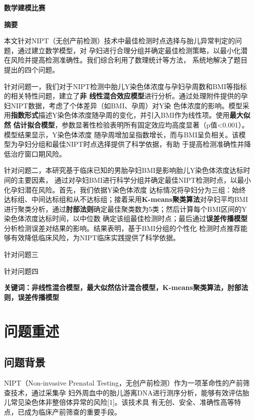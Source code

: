 \documentclass{article}
\date{}
\begin{document}
\vspace{-30pt}
\begin{center}
    \Large \textbf{数学建模比赛}  %
\end{center}
\vspace{-13pt}
\begin{center}
    \large \textbf{摘要}  %
\end{center}
\qquad 本文针对NIPT（无创产前检测）技术中最佳检测时点选择与胎儿异常判定的问题，通过建立数学模型，对
孕妇进行合理分组并确定最佳检测策略，以最小化潜在风险并提高检测准确性。我们综合利用了数理统计等方法，
系统地解决了题目提出的四个问题。

针对问题一，我们对于NIPT检测中胎儿Y染色体浓度与孕妇孕周数和BMI等指标的相关特性问题，建立了\textbf{非
    线性混合效应模型}进行分析。通过处理附件提供的孕妇NIPT数据，考虑了个体差异（如BMI、孕周）对Y染
色体浓度的影响。模型采用\textbf{指数形式}描述Y染色体浓度随孕周的变化，并引入BMI作为线性项。使用\textbf{最大似然
    估计拟合模型}，参数显著性检验表明所有固定效应均高度显著（p值<0.001）。模型结果显示，Y染色体浓度
随孕周增加呈指数增长，而与BMI呈负相关。该模型为孕妇分组和最佳NIPT时点选择提供了科学依据，有助
于提高检测准确性并降低治疗窗口期风险。

针对问题二，本研究基于临床已知的男胎孕妇BMI是影响胎儿Y染色体浓度达标时间的主要因素，
通过对孕妇BMI进行科学分组并确定最佳NIPT检测时点，以最小化孕妇潜在风险。首先，我们依据Y染色体浓度
达标情况将孕妇分为三组：始终达标组、中间达标组和从不达标组；接着采用\textbf{K-means聚类算法}对孕妇平均BMI
进行聚类分析，通过\textbf{肘部法则}确定最佳聚类数为5类；然后计算每个BMI区间的Y染色体浓度达标时间，以中位数
确定该组最佳检测时点；最后通过\textbf{误差传播模型}分析检测误差对结果的影响。结果表明，基于BMI分组的个性化
检测时点推荐能够有效降低临床风险，为NIPT临床实践提供了科学依据。

针对问题三

针对问题四

\textbf{关键词：非线性混合模型，最大似然估计混合模型，K-means聚类算法，肘部法则，误差传播模型}
\newpage
\section{\textbf{问题重述}}
\subsection{\textbf{问题背景}}
NIPT（Non-invasive Prenatal Testing，无创产前检测）作为一项革命性的产前筛查技术，通过采集孕
妇外周血中的胎儿游离DNA进行测序分析，能够有效评估胎儿常见染色体非整倍体异常的风险[1]。该技术具
有无创、安全、准确性高等特点，已成为临床产前筛查的重要手段。
\end{document}
